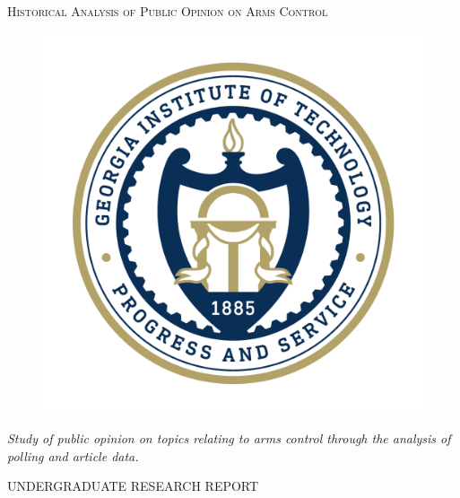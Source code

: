 \documentclass[11,5 pt]{article}
\begin{document}
\begin{titlepage}

\centering

{\scshape\LARGE Historical Analysis of Public Opinion on Arms Control}

\begin{figure}[ht!]
\centering
\vspace{0.5 cm}
\includegraphics[scale=0.25]{images/gt-seal_0.png}
\end{figure}
\vspace{0.39 cm}

\centering

{\itshape\LARGE Study of public opinion on topics relating to arms control through the analysis of polling and article data. 
 \par}
\vspace{1.3cm}
{\scshape\LARGE UNDERGRADUATE RESEARCH REPORT\par}
\vspace{0.2 cm}


\end{titlepage}
\end{document}
